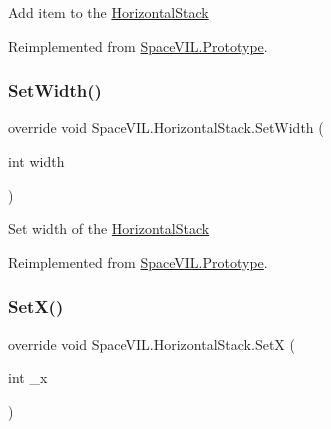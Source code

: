 Add item to the \mbox{\hyperlink{class_space_v_i_l_1_1_horizontal_stack}{Horizontal\+Stack}} 



Reimplemented from \mbox{\hyperlink{class_space_v_i_l_1_1_prototype}{Space\+V\+I\+L.\+Prototype}}.

\mbox{\label{class_space_v_i_l_1_1_horizontal_stack_aa0650cd4cc25c1471f7b31748a6fd7e1}} 
\subsubsection{\texorpdfstring{Set\+Width()}{SetWidth()}}
{\footnotesize\ttfamily override void Space\+V\+I\+L.\+Horizontal\+Stack.\+Set\+Width (\begin{DoxyParamCaption}\item[{int}]{width }\end{DoxyParamCaption})\hspace{0.3cm}{\ttfamily [virtual]}}



Set width of the \mbox{\hyperlink{class_space_v_i_l_1_1_horizontal_stack}{Horizontal\+Stack}} 



Reimplemented from \mbox{\hyperlink{class_space_v_i_l_1_1_prototype_a6a4f1b9581f4d18f1c3a3e287d4b2a2b}{Space\+V\+I\+L.\+Prototype}}.

\mbox{\label{class_space_v_i_l_1_1_horizontal_stack_abfcfb03003ed514e6262ae9004688477}} 
\subsubsection{\texorpdfstring{Set\+X()}{SetX()}}
{\footnotesize\ttfamily override void Space\+V\+I\+L.\+Horizontal\+Stack.\+SetX (\begin{DoxyParamCaption}\item[{int}]{\+\_\+x }\end{DoxyParamCaption})\hspace{0.3cm}{\ttfamily [virtual]}}



